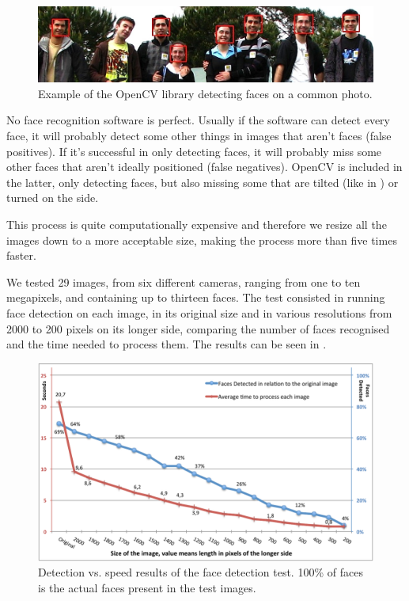 \begin{figure}[ht]
	\centering
		\includegraphics[width=\columnwidth]{Figures/faces1.jpg}
	\caption{Example of the OpenCV library detecting faces on a common photo.}
	\label{fig:faces1}
\end{figure}

No face recognition software is perfect. Usually if the software can detect every face, it will probably detect some other things in images that aren't faces (false positives). If it’s successful in only detecting faces, it will probably miss some other faces that aren't ideally positioned (false negatives). OpenCV is included in the latter, only detecting faces, but also missing some that are tilted (like in ) or turned on the side.


This process is quite computationally expensive and therefore we resize all the images down to a more acceptable size, making the process more than five times faster.

We tested 29 images, from six different cameras, ranging from one to ten megapixels, and containing up to thirteen faces. The test consisted in running face detection on each image, in its original size and in various resolutions from 2000 to 200 pixels on its longer side, comparing the number of faces recognised and the time needed to process them. The results can be seen in .

\begin{figure}[ht]
	\centering
		\includegraphics[width=\columnwidth]{Figures/graph2.pdf}
	\caption[Detection vs. speed results of the face detection test.]{Detection vs. speed results of the face detection test. 100\% of faces is the actual faces present in the test images.}
	\label{fig:fdres}
\end{figure}

